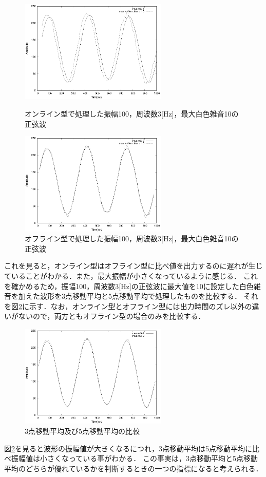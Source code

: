 \documentclass[titlepage]{jarticle}
\begin{document}
\begin{figure}[H]
  \begin{minipage}{0.495\hsize}
    \centering
    \includegraphics[width=7cm]{EPS/mvave5-1.eps}
    \caption{オンライン型で処理した振幅100，周波数3[Hz]，最大白色雑音10の正弦波}
    \label{fig:5point:1}
  \end{minipage}
  \begin{minipage}{0.495\hsize}
    \centering
    \includegraphics[width=7cm]{EPS/mvave5-2.eps}
    \caption{オフライン型で処理した振幅100，周波数3[Hz]，最大白色雑音10の正弦波}
    \label{fig:5point:2}
  \end{minipage}
\end{figure}
これを見ると，オンライン型はオフライン型に比べ値を出力するのに遅れが生じていることがわかる．また，最大振幅が小さくなっているように感じる．
これを確かめるため，振幅100，周波数3[Hz]の正弦波に最大値を10に設定した白色雑音を加えた波形を3点移動平均と5点移動平均で処理したものを比較する．
それを図\ref{周央サンゴ}に示す．なお，オンライン型とオフライン型には出力時間のズレ以外の違いがないので，両方ともオフライン型の場合のみを比較する．
\begin{figure}[H]
  \centering
  \includegraphics[width=7cm]{EPS/3-5.eps}
  \caption{3点移動平均及び5点移動平均の比較}
  \label{周央サンゴ}
\end{figure}
図\ref{周央サンゴ}を見ると波形の振幅値が大きくなるにつれ，3点移動平均は5点移動平均に比べ振幅値は小さくなっている事がわかる．
この事実は，3点移動平均と5点移動平均のどちらが優れているかを判断するときの一つの指標になると考えられる．
\end{document}
